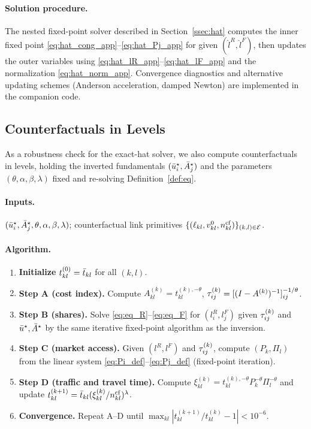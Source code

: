 \paragraph{Solution procedure.}
The nested fixed-point solver described in Section~\ref{ssec:hat}
computes the inner fixed point
\eqref{eq:hat_cong_app}--\eqref{eq:hat_Pj_app} for given
$(\hat l^R,\hat l^F)$, then updates the outer variables using
\eqref{eq:hat_lR_app}--\eqref{eq:hat_lF_app} and the normalization
\eqref{eq:hat_norm_app}.  Convergence diagnostics and alternative
updating schemes (Anderson acceleration, damped Newton) are
implemented in the companion code.

\subsection{Counterfactuals in Levels}\label{app:levels}

As a robustness check for the exact-hat solver, we also compute
counterfactuals in levels, holding the inverted fundamentals
$(\bar u_i^{\star},\bar A_j^{\star})$ and the parameters
$(\theta,\alpha,\beta,\lambda)$ fixed and re-solving
Definition~\ref{def:eq}.

\paragraph{Inputs.}
$(\bar u_i^{\star},\bar A_j^{\star},\theta,\alpha,\beta,\lambda)$;
counterfactual link primitives
$\{(\ell_{kl},v_{kl}^{0},n_{kl}^{\mathrm{cf}})\}_{(k,l)\in\mathcal E}$.

\paragraph{Algorithm.}
\begin{enumerate}[leftmargin=2em,itemsep=0.2em]
\item \textbf{Initialize} $t_{kl}^{(0)}=\bar t_{kl}$ for all $(k,l)$.
\item \textbf{Step A (cost index).} Compute
      $A^{(k)}_{kl}=t_{kl}^{(k),-\theta}$, $\tau_{ij}^{(k)}=
      [(I-A^{(k)})^{-1}]_{ij}^{-1/\theta}$.
\item \textbf{Step B (shares).} Solve
      \eqref{eq:eq_R}--\eqref{eq:eq_F} for $(l_i^R,l_j^F)$ given
      $\tau_{ij}^{(k)}$ and $\bar u^{\star},\bar A^{\star}$ by the same
      iterative fixed-point algorithm as the inversion.
\item \textbf{Step C (market access).} Given $(l^R,l^F)$ and
      $\tau_{ij}^{(k)}$, compute $(P_k,\Pi_l)$ from the linear system
      \eqref{eq:Pi_def}--\eqref{eq:Pj_def} (fixed-point iteration).
\item \textbf{Step D (traffic and travel time).} Compute
      $\xi_{kl}^{(k)}=t_{kl}^{(k),-\theta}P_k^{-\theta}\Pi_l^{-\theta}$
      and update
      $t_{kl}^{(k+1)}=\bar t_{kl}(\xi_{kl}^{(k)}/n_{kl}^{\mathrm{cf}})^{\lambda}$.
\item \textbf{Convergence.} Repeat A--D until
      $\max_{kl}|t_{kl}^{(k+1)}/t_{kl}^{(k)}-1|<10^{-6}$.
\end{enumerate}

